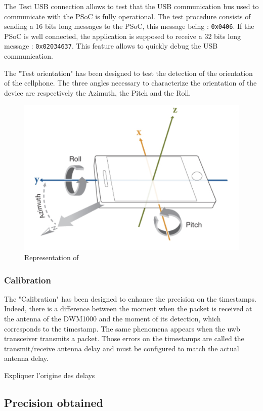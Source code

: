The Test USB connection allows to test that the USB communication bus used to communicate with the PSoC is fully operational. The test procedure consists of sending a 16 bits long messages to the PSoC, this message being : \texttt{0x0406}. If the PSoC is well connected, the application is supposed to receive a 32 bits long message : \texttt{0x02034637}. This feature allows to quickly debug the USB communication.
\vspace{2mm}

The "Test orientation" has been designed to test the detection of the orientation of the cellphone. The three angles necessary to characterize the orientation of the device are respectively the Azimuth, the Pitch and the Roll.

\begin{figure}
\centering
\includegraphics[width=.6\linewidth]{Images/angles_gsm.png}
\caption{\color{red} Representation of \color{black}}
\end{figure}

\subsubsection{Calibration}

The "Calibration" has been designed to enhance the precision on the timestamps. Indeed, there is a difference between the moment when the packet is received at the antenna of the DWM1000 and the moment of its detection, which corresponds to the timestamp. The same phenomena appears when the \gls{uwb} transceiver transmits a packet. Those errors on the timestamps are called the transmit/receive antenna delay and must be configured to match the actual antenna delay.

\color{red} Expliquer l'origine des delays \color{black}

\subsection{Precision obtained}

